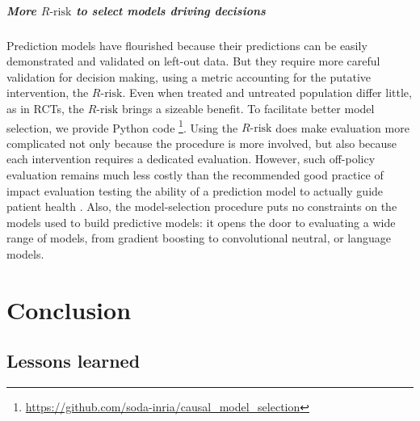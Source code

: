 \documentclass[french,12pt,twoside,a4paper]{book}
\begin{document}
\paragraph{More $R\text{-risk}$ to select models driving decisions}

Prediction models have flourished because their predictions can be easily
demonstrated and validated on left-out data. But they require more
careful validation for decision making, using a metric accounting for the
putative intervention, the $R\text{-risk}$. Even when treated and
untreated population differ little, as in RCTs, the $R\text{-risk}$
brings a sizeable benefit. To facilitate better model selection, we provide Python
code \footnote{\url{https://github.com/soda-inria/causal_model_selection}}.
Using the $R\text{-risk}$ does make evaluation more
complicated not only because the procedure is more involved, but also
because each intervention requires a dedicated evaluation. However, such
off-policy evaluation remains much less costly than the recommended good
practice of impact evaluation testing the ability of a prediction model
to actually guide patient health \citep{hendriksen2013diagnostic}. Also,
the model-selection procedure puts no constraints on the models used to
build predictive models: it opens the door to evaluating a wide range of
models, from gradient boosting to convolutional neutral, or language
models.







\chapter{Conclusion}\label{chapter:conclusion}

\section{Lessons learned}
%
\end{document}
